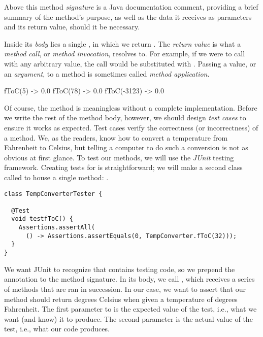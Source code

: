 Above this method \emph{signature} is a Java documentation comment, providing a brief summary of the method's purpose, as well as the data it receives as parameters and its return value, should it be necessary. 

Inside its \emph{body} lies a single , in which we return . 
The \emph{return value} is what a \emph{method call}, or \emph{method invocation}, resolves to. 
For example, if we were to call  with any arbitrary  value, the call would be substituted with . 
Passing a value, or an \emph{argument}, to a method is sometimes called \emph{method application}.

\begin{verbnobox}[\small]
fToC(5)     -> 0.0
fToC(78)    -> 0.0
fToC(-3123) -> 0.0
\end{verbnobox}

Of course, the  method is meaningless without a complete implementation. 
Before we write the rest of the method body, however, we should design \emph{test cases} to ensure it works as expected. 
Test cases verify the correctness (or incorrectness) of a method. 
We, as the readers, know how to convert a temperature from Fahrenheit to Celsius, but telling a computer to do such a conversion is not as obvious at first glance. 
To test our methods, we will use the \emph{JUnit} testing framework. Creating tests for  is straightforward; we will make a second class called  to house a single method: .

\begin{lstlisting}[language=MyJava]
class TempConverterTester {

  @Test
  void testfToC() {
    Assertions.assertAll(
      () -> Assertions.assertEquals(0, TempConverter.fToC(32)));
  }
}
\end{lstlisting}

We want JUnit to recognize that  contains testing code, so we prepend the  annotation to the method signature. 
In its body, we call , which receives a series of methods that are ran in succession. 
In our case, we want to assert that our  method should return  degrees Celsius when given a temperature of  degrees Fahrenheit. 
The first parameter to  is the expected value of the test, i.e., what we want (and know) it to produce. 
The second parameter is the actual value of the test, i.e., what our code produces. 


